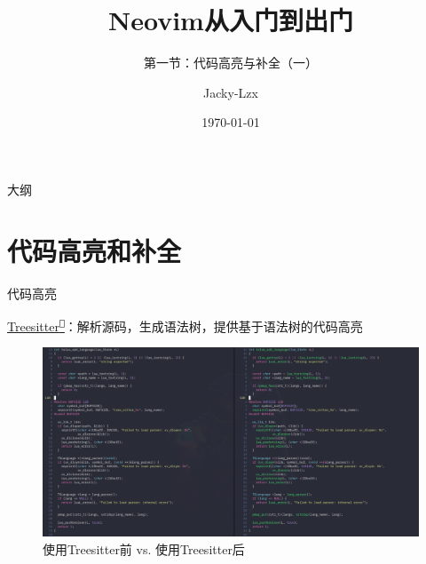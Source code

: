 \documentclass[aspectratio=169]{ctexbeamer}
\title{Neovim从入门到出门}
\subtitle{第一节：代码高亮与补全（一）}
\author{Jacky-Lzx}
\date{\today}
\newcommand{\nerd}[1]{\texttt{#1}}
\newcommand{\link}[3][]{\href{#3}{#2\textsuperscript{\nerd{}}}}
\begin{document}
\begin{frame}
  \titlepage
\end{frame}

\begin{frame}{大纲}
  \tableofcontents
\end{frame}

\section{代码高亮和补全}

  \begin{frame}{代码高亮}

    \link{Treesitter}{https://tree-sitter.github.io/tree-sitter/}：解析源码，生成语法树，提供基于语法树的代码高亮

    \begin{figure}[htbp]
      \centering
      \includegraphics[width=0.6\linewidth]{./Figures/Treesitter_compare.png}
      \caption{使用Treesitter前 vs. 使用Treesitter后}%
    \end{figure}
  \end{frame}
\end{document}
